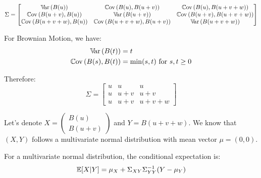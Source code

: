\documentclass[12pt]{article}
\begin{document}
\begin{enumerate}
		\begin{equation*}
			\Sigma = \begin{bmatrix}
				\mathbb{V}\!\mathrm{ar}\,(B(u)) & \mathbb{C}\mathrm{ov}\,(B(u), B(u+v)) & \mathbb{C}\mathrm{ov}\,(B(u), B(u+v+w)) \\
				\mathbb{C}\mathrm{ov}\,(B(u+v), B(u)) & \mathbb{V}\!\mathrm{ar}\,(B(u+v)) & \mathbb{C}\mathrm{ov}\,(B(u+v), B(u+v+w)) \\
				\mathbb{C}\mathrm{ov}\,(B(u+v+w), B(u)) & \mathbb{C}\mathrm{ov}\,(B(u+v+w), B(u+v)) & \mathbb{V}\!\mathrm{ar}\,(B(u+v+w))
			\end{bmatrix}
		\end{equation*}
		
		For Brownian Motion, we have:
		\begin{align*}
			\mathbb{V}\!\mathrm{ar}\,(B(t)) &= t \\
			\mathbb{C}\mathrm{ov}\,(B(s), B(t)) &= \min(s, t) \text{ for } s, t \geq 0
		\end{align*}
		
		Therefore:
		\begin{equation*}
			\Sigma = \begin{bmatrix}
				u & u & u \\
				u & u+v & u+v \\
				u & u+v & u+v+w
			\end{bmatrix}
		\end{equation*}
		
		Let's denote $X = \begin{pmatrix}
			B(u)\\
			B(u+v)
		\end{pmatrix}$ and $Y = B(u+v+w)$. We know that $(X, Y)$ follows a multivariate normal distribution with mean vector $\mu = (0, 0)$.
		
		For a multivariate normal distribution, the conditional expectation is:
		\begin{equation*}
			\mathbb{E}[X|Y] = \mu_X + \Sigma_{XY}\Sigma_{YY}^{-1}(Y - \mu_Y)
		\end{equation*}
		

\end{enumerate}
\end{document}
